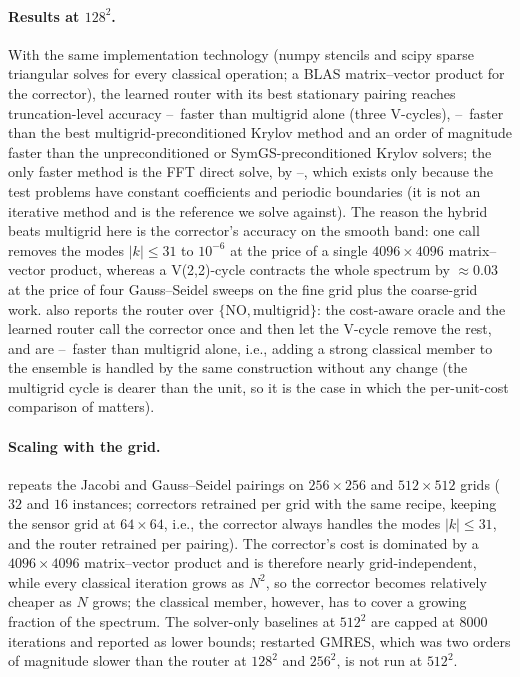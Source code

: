 \paragraph{Results at $128^2$.} With the same implementation technology (numpy stencils and scipy sparse triangular solves for every classical operation; a BLAS matrix--vector product for the corrector), the learned router with its best stationary pairing reaches truncation-level accuracy \caVsMgMin--\caVsMgMax\ faster than multigrid alone (three V-cycles), \caVsKrylovMin--\caVsKrylovMax\ faster than the best multigrid-preconditioned Krylov method and an order of magnitude faster than the unpreconditioned or SymGS-preconditioned Krylov solvers; the only faster method is the FFT direct solve, by \caFftRatioMin--\caFftRatioMax, which exists only because the test problems have constant coefficients and periodic boundaries (it is not an iterative method and is the reference we solve against). The reason the hybrid beats multigrid here is the corrector's accuracy on the smooth band: one call removes the modes $|k|\le 31$ to $10^{-6}$ at the price of a single $4096\times4096$ matrix--vector product, whereas a V(2,2)-cycle contracts the whole spectrum by $\approx 0.03$ at the price of four Gauss--Seidel sweeps on the fine grid plus the coarse-grid work.  also reports the router over $\{\mathrm{NO}, \text{multigrid}\}$: the cost-aware oracle and the learned router call the corrector once and then let the V-cycle remove the rest, and are \caVsMgEnsMin--\caVsMgEnsMax\ faster than multigrid alone, i.e., adding a strong classical member to the ensemble is handled by the same construction without any change (the multigrid cycle is dearer than the unit, so it is the case in which the per-unit-cost comparison of  matters).

\paragraph{Scaling with the grid.}  repeats the Jacobi and Gauss--Seidel pairings on $256\times 256$ and $512\times 512$ grids ($32$ and $16$ instances; correctors retrained per grid with the same recipe, keeping the sensor grid at $64\times 64$, i.e., the corrector always handles the modes $|k|\le 31$, and the router retrained per pairing). The corrector's cost is dominated by a $4096\times 4096$ matrix--vector product and is therefore nearly grid-independent, while every classical iteration grows as $N^2$, so the corrector becomes relatively cheaper as $N$ grows; the classical member, however, has to cover a growing fraction of the spectrum. The solver-only baselines at $512^2$ are capped at $8000$ iterations and reported as lower bounds; restarted GMRES, which was two orders of magnitude slower than the router at $128^2$ and $256^2$, is not run at $512^2$.

